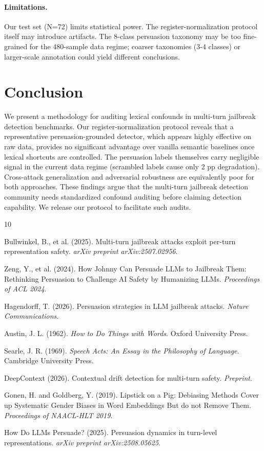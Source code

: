 \documentclass[11pt]{article}
\begin{document}
\paragraph{Limitations.}
Our test set (N=72) limits statistical power. The register-normalization protocol itself may introduce artifacts. The 8-class persuasion taxonomy may be too fine-grained for the 480-sample data regime; coarser taxonomies (3-4 classes) or larger-scale annotation could yield different conclusions.

\section{Conclusion}

We present a methodology for auditing lexical confounds in multi-turn jailbreak detection benchmarks. Our register-normalization protocol reveals that a representative persuasion-grounded detector, which appears highly effective on raw data, provides no significant advantage over vanilla semantic baselines once lexical shortcuts are controlled. The persuasion labels themselves carry negligible signal in the current data regime (scrambled labels cause only 2 pp degradation). Cross-attack generalization and adversarial robustness are equivalently poor for both approaches. These findings argue that the multi-turn jailbreak detection community needs standardized confound auditing before claiming detection capability. We release our protocol to facilitate such audits.


\begin{thebibliography}{10}

Bullwinkel, B., et al. (2025).
Multi-turn jailbreak attacks exploit per-turn representation safety.
\textit{arXiv preprint arXiv:2507.02956}.

Zeng, Y., et al. (2024).
How Johnny Can Persuade LLMs to Jailbreak Them: Rethinking Persuasion to Challenge AI Safety by Humanizing LLMs.
\textit{Proceedings of ACL 2024}.

Hagendorff, T. (2026).
Persuasion strategies in LLM jailbreak attacks.
\textit{Nature Communications}.

Austin, J. L. (1962).
\textit{How to Do Things with Words}.
Oxford University Press.

Searle, J. R. (1969).
\textit{Speech Acts: An Essay in the Philosophy of Language}.
Cambridge University Press.

DeepContext (2026).
Contextual drift detection for multi-turn safety.
\textit{Preprint}.

Gonen, H. and Goldberg, Y. (2019).
Lipstick on a Pig: Debiasing Methods Cover up Systematic Gender Biases in Word Embeddings But do not Remove Them.
\textit{Proceedings of NAACL-HLT 2019}.

How Do LLMs Persuade? (2025).
Persuasion dynamics in turn-level representations.
\textit{arXiv preprint arXiv:2508.05625}.

\end{thebibliography}
\end{document}
